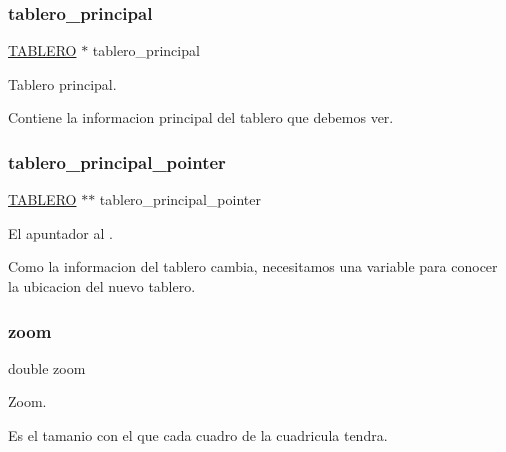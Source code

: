 \subsubsection{\texorpdfstring{tablero\+\_\+principal}{tablero\_principal}}
{\footnotesize\ttfamily \hyperlink{tablero_8h_acbb1e9c862ccf810af77512ddb019a82}{T\+A\+B\+L\+E\+RO} $\ast$ tablero\+\_\+principal}



Tablero principal. 

Contiene la informacion principal del tablero que debemos ver. \mbox{\label{interfaz-grafica_8h_a49c95bc75b43151a9098a1d2485b7f25}} 
\subsubsection{\texorpdfstring{tablero\+\_\+principal\+\_\+pointer}{tablero\_principal\_pointer}}
{\footnotesize\ttfamily \hyperlink{tablero_8h_acbb1e9c862ccf810af77512ddb019a82}{T\+A\+B\+L\+E\+RO} $\ast$$\ast$ tablero\+\_\+principal\+\_\+pointer}



El apuntador al . 

Como la informacion del tablero cambia, necesitamos una variable para conocer la ubicacion del nuevo tablero. \mbox{\label{interfaz-grafica_8h_a9c59ed4a7b6bdc2b1207e39fabf379a4}} 
\subsubsection{\texorpdfstring{zoom}{zoom}}
{\footnotesize\ttfamily double zoom}



Zoom. 

Es el tamanio con el que cada cuadro de la cuadricula tendra. 